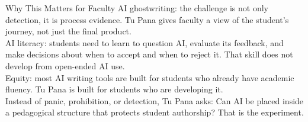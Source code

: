 \documentclass[aspectratio=169]{beamer}
\begin{document}
\begin{frame}{Why This Matters for Faculty}
{    AI ghostwriting: the challenge is not only detection, it is process evidence. Tu Pana gives faculty a view of the student's journey, not just the final product.\\[0.5em]
    AI literacy: students need to learn to question AI, evaluate its feedback, and make decisions about when to accept and when to reject it. That skill does not develop from open-ended AI use.\\[0.5em]
    Equity: most AI writing tools are built for students who already have academic fluency. Tu Pana is built for students who are developing it.\\[0.5em]
    Instead of panic, prohibition, or detection, Tu Pana asks: Can AI be placed inside a pedagogical structure that protects student authorship? That is the experiment.
  }
\end{frame}
\end{document}
